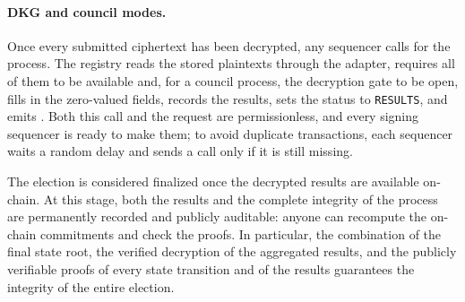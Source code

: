 \paragraph{\ac{DKG} and council modes.} Once every submitted ciphertext has been decrypted, any sequencer calls  for the process. The registry reads the stored plaintexts through the adapter, requires all of them to be available and, for a council process, the decryption gate to be open, fills in the zero-valued fields, records the results, sets the status to \texttt{RESULTS}, and emits . Both this call and the request are permissionless, and every signing sequencer is ready to make them; to avoid duplicate transactions, each sequencer waits a random delay and sends a call only if it is still missing.

\medskip
\noi The election is considered finalized once the decrypted results are available on-chain. At
this stage, both the results and the complete integrity of the process are permanently recorded
and publicly auditable: anyone can recompute the on-chain commitments and check the proofs. In particular, the combination of the final state root, the verified decryption of the
aggregated results, and the publicly verifiable proofs of every state transition and of the results guarantees
the integrity of the entire election.

